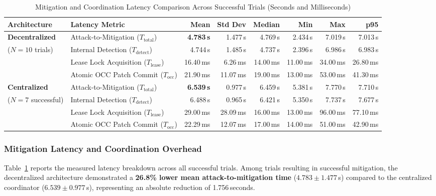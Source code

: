\begin{table}[t]
\centering
\caption{Mitigation and Coordination Latency Comparison Across Successful Trials (Seconds and Milliseconds)}
\label{tab:scenario1_latencies}
\small
\begin{tabular}{llrrrrrr}
\toprule
\textbf{Architecture} & \textbf{Latency Metric} & \textbf{Mean} & \textbf{Std Dev} & \textbf{Median} & \textbf{Min} & \textbf{Max} & \textbf{p95} \\
\midrule
\textbf{Decentralized} & Attack-to-Mitigation ($T_{\text{total}}$) & \textbf{4.783\,s} & 1.477\,s & 4.769\,s & 2.434\,s & 7.019\,s & 7.013\,s \\
($N=10$ trials) & Internal Detection ($T_{\text{detect}}$) & 4.744\,s & 1.485\,s & 4.737\,s & 2.396\,s & 6.986\,s & 6.983\,s \\
& Lease Lock Acquisition ($T_{\text{lease}}$) & 16.40\,ms & 6.26\,ms & 14.00\,ms & 11.00\,ms & 34.00\,ms & 26.80\,ms \\
& Atomic OCC Patch Commit ($T_{\text{occ}}$) & 21.90\,ms & 11.07\,ms & 19.00\,ms & 13.00\,ms & 53.00\,ms & 41.30\,ms \\
\midrule
\textbf{Centralized} & Attack-to-Mitigation ($T_{\text{total}}$) & \textbf{6.539\,s} & 0.977\,s & 6.459\,s & 5.381\,s & 7.770\,s & 7.710\,s \\
($N=7$ successful) & Internal Detection ($T_{\text{detect}}$) & 6.488\,s & 0.965\,s & 6.421\,s & 5.350\,s & 7.737\,s & 7.677\,s \\
& Lease Lock Acquisition ($T_{\text{lease}}$) & 29.00\,ms & 28.09\,ms & 16.00\,ms & 13.00\,ms & 96.00\,ms & 77.10\,ms \\
& Atomic OCC Patch Commit ($T_{\text{occ}}$) & 22.29\,ms & 12.07\,ms & 17.00\,ms & 14.00\,ms & 51.00\,ms & 42.90\,ms \\
\bottomrule
\end{tabular}
\vspace{1ex}
\end{table}

\subsubsection{Mitigation Latency and Coordination Overhead}
Table~\ref{tab:scenario1_latencies} reports the measured latency breakdown across all successful trials. Among trials resulting in successful mitigation, the decentralized architecture demonstrated a \textbf{26.8\% lower mean attack-to-mitigation time} ($4.783\pm 1.477$\,s) compared to the centralized coordinator ($6.539\pm 0.977$\,s), representing an absolute reduction of 1.756\,seconds.

